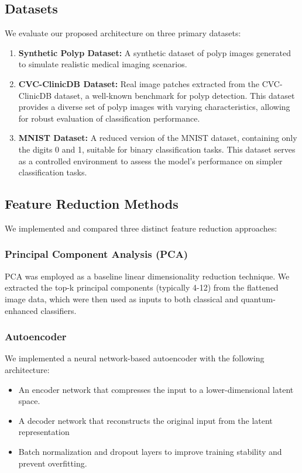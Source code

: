 \documentclass[conference]{IEEEtran}
\begin{document}
\subsection{Datasets}
We evaluate our proposed architecture on three primary datasets:
\begin{enumerate}
    \item \textbf{Synthetic Polyp Dataset:} 
    A synthetic dataset of polyp images generated to simulate 
    realistic medical imaging scenarios.
    
    \item \textbf{CVC-ClinicDB Dataset:} 
    Real image patches extracted from the CVC-ClinicDB 
    dataset, a well-known benchmark for polyp detection. 
    This dataset provides a diverse set of polyp images 
    with varying characteristics, allowing for robust 
    evaluation of classification performance.
    
    \item \textbf{MNIST Dataset:} 
    A reduced version of the MNIST dataset, 
    containing only the digits 0 and 1, suitable 
    for binary classification tasks. This dataset 
    serves as a controlled environment to assess 
    the model's performance on simpler classification tasks.
\end{enumerate}

\subsection{Feature Reduction Methods}
We implemented and compared three distinct feature reduction approaches:
\subsubsection{Principal Component Analysis (PCA)}
PCA was employed as a baseline linear 
dimensionality reduction technique. 
We extracted the top-k principal components 
(typically 4-12) from the flattened image data, 
which were then used as inputs to both classical and 
quantum-enhanced classifiers.

\subsubsection{Autoencoder}
We implemented a neural network-based autoencoder with the following architecture:

\begin{itemize}
    \item An encoder network that compresses
    the input to a lower-dimensional latent space.
    
    \item A decoder network that reconstructs 
    the original input from the latent representation

    \item Batch normalization and dropout layers 
    to improve training stability and prevent overfitting.
\end{itemize}
\end{document}
